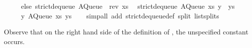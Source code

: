 \begin{isabellebody}
\ \ \ \ \ else\ strict{\isacharunderscore}dequeue{\isacharprime}\ {\isacharparenleft}AQueue\ {\isacharbrackleft}{\isacharbrackright}\ {\isacharparenleft}rev\ xs{\isacharparenright}{\isacharparenright}{\isacharparenright}{\isachardoublequoteclose}\isanewline
\ \ {\isachardoublequoteopen}strict{\isacharunderscore}dequeue{\isacharprime}\ {\isacharparenleft}AQueue\ xs\ {\isacharparenleft}y\ {\isacharhash}\ ys{\isacharparenright}{\isacharparenright}\ {\isacharequal}\isanewline
\ \ \ \ \ {\isacharparenleft}y{\isacharcomma}\ AQueue\ xs\ ys{\isacharparenright}{\isachardoublequoteclose}\isanewline
\ \ \isamarkupfalse%
\ {\isacharparenleft}simp{\isacharunderscore}all\ add{\isacharcolon}\ strict{\isacharunderscore}dequeue{\isacharprime}{\isacharunderscore}def\ split{\isacharcolon}\ list{\isachardot}splits{\isacharparenright}%
\endisatagquote
{\isafoldquote}%
%
\isadelimquote
%
\endisadelimquote
%
\begin{isamarkuptext}%
Observe that on the right hand side of the definition of , the unspecified constant  occurs.


\end{isamarkuptext}
\end{isabellebody}

